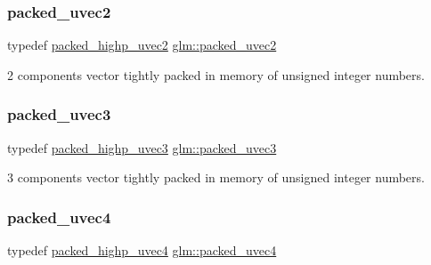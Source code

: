 \subsubsection{\texorpdfstring{packed\+\_\+uvec2}{packed\_uvec2}}
{\footnotesize\ttfamily typedef \hyperlink{group__gtc__type__aligned_gafd17d664314ead069de290b1d5137c47}{packed\+\_\+highp\+\_\+uvec2} \hyperlink{group__gtc__type__aligned_gac05992fb0ced52150634ce1d8f95a8ad}{glm\+::packed\+\_\+uvec2}}



2 components vector tightly packed in memory of unsigned integer numbers. 

\mbox{\label{group__gtc__type__aligned_ga4433b8f226dc66e91e99cb8079ddc7e3}} 
\subsubsection{\texorpdfstring{packed\+\_\+uvec3}{packed\_uvec3}}
{\footnotesize\ttfamily typedef \hyperlink{group__gtc__type__aligned_ga607425d3ca2ad292b115d09aef19e372}{packed\+\_\+highp\+\_\+uvec3} \hyperlink{group__gtc__type__aligned_ga4433b8f226dc66e91e99cb8079ddc7e3}{glm\+::packed\+\_\+uvec3}}



3 components vector tightly packed in memory of unsigned integer numbers. 

\mbox{\label{group__gtc__type__aligned_ga32a9f8facf5745a6513186ce61122310}} 
\subsubsection{\texorpdfstring{packed\+\_\+uvec4}{packed\_uvec4}}
{\footnotesize\ttfamily typedef \hyperlink{group__gtc__type__aligned_ga769bab317264c023f8ee77897e4b5894}{packed\+\_\+highp\+\_\+uvec4} \hyperlink{group__gtc__type__aligned_ga32a9f8facf5745a6513186ce61122310}{glm\+::packed\+\_\+uvec4}}



